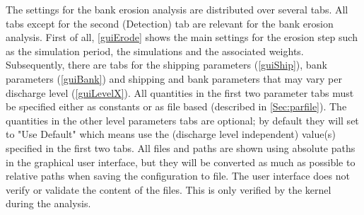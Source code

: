 

The settings for the bank erosion analysis are distributed over several tabs.
All tabs except for the second (Detection) tab are relevant for the bank erosion analysis.
First of all, \autoref{guiErode} shows the main settings for the erosion step such as the simulation period, the simulations and the associated weights.
Subsequently, there are tabs for the shipping parameters (\autoref{guiShip}), bank parameters (\autoref{guiBank}) and shipping and bank parameters that may vary per discharge level (\autoref{guiLevelX}).
All quantities in the first two parameter tabs must be specified either as constants or as file based (described in \autoref{Sec:parfile}).
The quantities in the other level parameters tabs are optional; by default they will set to "Use Default" which means use the (discharge level independent) value(s) specified in the first two tabs.
All files and paths are shown using absolute paths in the graphical user interface, but they will be converted as much as possible to relative paths when saving the configuration to file.
The user interface does not verify or validate the content of the files.
This is only verified by the kernel during the analysis.



